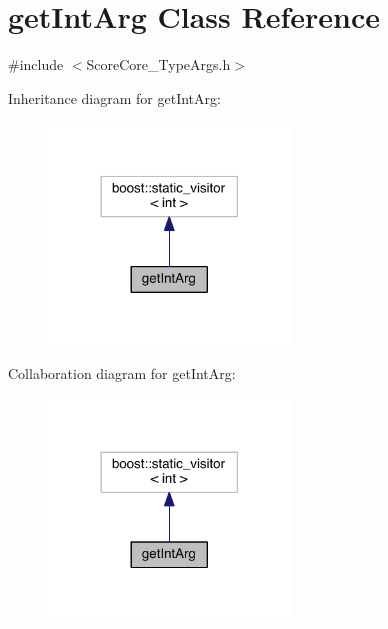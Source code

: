 \hypertarget{classget_int_arg}{\section{get\-Int\-Arg Class Reference}
\label{classget_int_arg}
}


{\ttfamily \#include $<$Score\-Core\-\_\-\-Type\-Args.\-h$>$}



Inheritance diagram for get\-Int\-Arg\-:\nopagebreak
\begin{figure}[H]
\begin{center}
\leavevmode
\includegraphics[width=182pt]{classget_int_arg__inherit__graph}
\end{center}
\end{figure}


Collaboration diagram for get\-Int\-Arg\-:\nopagebreak
\begin{figure}[H]
\begin{center}
\leavevmode
\includegraphics[width=182pt]{classget_int_arg__coll__graph}
\end{center}
\end{figure}

